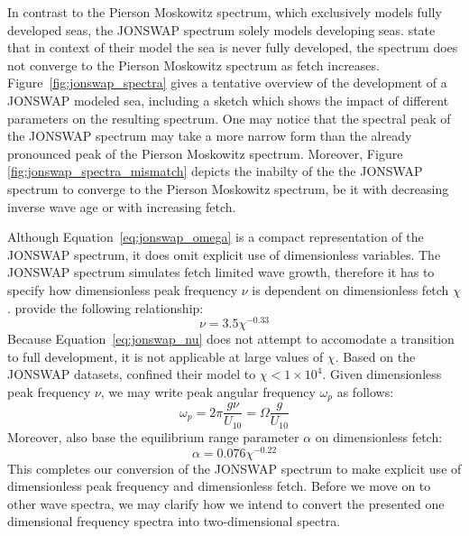 In contrast to the Pierson Moskowitz spectrum, which exclusively models fully 
developed seas, the JONSWAP spectrum solely models developing seas.
\citeauthor{article:Hasselman1973} state that in context of their model the sea is never fully developed, 
the spectrum does not converge to the Pierson Moskowitz spectrum as fetch 
increases. Figure~\ref{fig:jonswap_spectra} gives a tentative overview of the 
development of a JONSWAP modeled sea, including a sketch which shows the impact 
of different parameters on the resulting spectrum. One may notice that the 
spectral peak of the JONSWAP spectrum may take a more narrow form than the 
already pronounced peak of the Pierson Moskowitz spectrum. Moreover, Figure 
\ref{fig:jonswap_spectra_mismatch} depicts the inabilty of the the JONSWAP 
spectrum to converge to the Pierson Moskowitz spectrum, be it with decreasing 
inverse wave age or with increasing fetch.

Although Equation~\ref{eq:jonswap_omega} is a compact representation of the
JONSWAP spectrum, it does omit explicit use of dimensionless variables.
The JONSWAP spectrum simulates fetch limited wave growth, therefore it has to
specify how dimensionless peak frequency $\nu$ is dependent on dimensionless
fetch $\chi$. \citeauthor{article:Hasselman1973} provide the following relationship:
\begin{equation}
\label{eq:jonswap_nu}
 \nu = 3.5\chi^{-0.33}
\end{equation}
Because Equation~\ref{eq:jonswap_nu} does not attempt to accomodate a transition 
to full development, it is not applicable at large values of $\chi$. Based on 
the JONSWAP datasets, \citeauthor{article:Hasselman1973} confined their model
to $\chi < 1\times10^4$. Given dimensionless peak frequency $\nu$, we may write
peak  angular frequency $\omega_p$ as follows:
\begin{equation*}
 \omega_p = 2\pi\frac{g\nu}{U_{10}} = \Omega\frac{g}{U_{10}}
\end{equation*}
Moreover, \citeauthor{article:Hasselman1973} also base the equilibrium range
parameter $\alpha$ on dimensionless fetch:
\begin{equation*}
 \alpha = 0.076 \chi^{-0.22}
\end{equation*}
%
This completes our conversion of the JONSWAP spectrum to make explicit use of 
dimensionless peak frequency and dimensionless fetch.
Before we move on to other wave spectra, we may clarify how we intend to
convert the presented one dimensional frequency spectra into two-dimensional
\wavenumber spectra.
%
